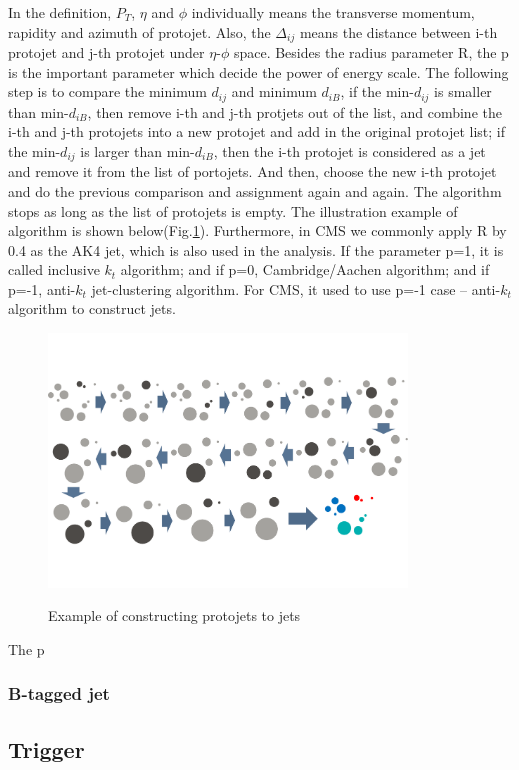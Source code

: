 		In the definition, $P_{T}$, $\eta$ and $\phi$ individually means the transverse momentum, rapidity and azimuth of protojet. Also, the $\Delta_{ij}$ means the distance between i-th protojet and j-th protojet under $\eta$-$\phi$ space. Besides the radius parameter R, the p is the important parameter which decide the power of energy scale. The following step is to compare the minimum $d_{ij}$ and minimum $d_{iB}$, if the min-$d_{ij}$ is smaller than min-$d_{iB}$, then remove i-th and j-th protjets out of the list, and combine the i-th and j-th protojets into a new protojet and add in the original protojet list; if the min-$d_{ij}$ is larger than min-$d_{iB}$, then the i-th protojet is considered as a jet and remove it from the list of portojets. And then, choose the new i-th protojet and do the previous comparison and assignment again and again. The algorithm stops as long as the list of protojets is empty. The illustration example of algorithm is shown below(Fig.\ref{PhysObj:fig:jet_algo}). Furthermore, in CMS we commonly apply R by 0.4 as the AK4 jet, which is also used in the analysis. If the parameter p=1, it is called inclusive $k_{t}$ algorithm; and if p=0, Cambridge/Aachen algorithm; and if p=-1, anti-$k_{t}$ jet-clustering algorithm. For CMS, it used to use p=-1 case -- anti-$k_{t}$ algorithm to construct jets.

		\begin{figure}[H]
		\centering{}
	    	\includegraphics[width=0.85\textwidth]{Figures/PhysObj/jet_algo.pdf}\\
		\caption{Example of constructing protojets to jets}
		\label{PhysObj:fig:jet_algo}
		\end{figure}
		\FloatBarrier

		The p 


		\subsubsection{B-tagged jet}
		\label{sssec:bjet}


	\subsection{Trigger}
	\label{ssec:PhysObj_trg}





\FloatBarrier
